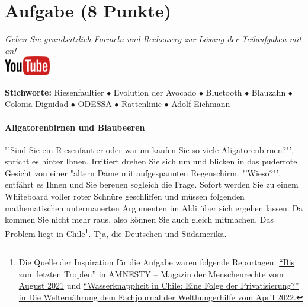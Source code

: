 \documentclass[a4paper, 9pt]{scrartcl}\usepackage[]{graphicx}\usepackage[]{xcolor}
\begin{document}
 
\clearpage

\section{Aufgabe \hfill (8 Punkte)}

\textit{Geben Sie grunds{\"a}tzlich Formeln und Rechenweg zur L{\"o}sung der
  Teilaufgaben mit an!} \\[1Ex]

\hfill\href{https://youtu.be/https://youtu.be/k2G52hMIfqk}{\includegraphics[width = 2cm]{img/youtube}} %
\hspace{2Ex}

{\tiny\textbf{Stichworte:} Riesenfaultier $\bullet$ Evolution der Avocado $\bullet$ Bluetooth $ \bullet$ Blauzahn $\bullet$ Colonia Dignidad $\bullet$ ODESSA $\bullet$ Rattenlinie $\bullet$ Adolf Eichmann}


\paragraph{Aligatorenbirnen und Blaubeeren}



"'Sind Sie ein Riesenfautier oder warum kaufen Sie so viele
Aligatorenbirnen?"', spricht es hinter Ihnen. Irritiert drehen Sie sich um
und blicken in das puderrote Gesicht von einer {"a}ltern Dame mit aufgespannten Regenschirm. "'Wieso?"', entfährt es
Ihnen und Sie bereuen sogleich die Frage. Sofort werden Sie zu einem
Whiteboard voller roter Schnüre geschliffen und müssen folgenden
mathematischen untermauerten Argumenten im Aldi über sich ergehen
lassen. Da kommen Sie nicht mehr raus, also können Sie auch gleich
mitmachen. Das Problem liegt in Chile\footnote{Die Quelle der Inspiration
  für die Aufgabe waren folgende Reportagen:
  \href{https://www.amnesty.ch/de/ueber-amnesty/publikationen/magazin-amnesty/2021-3/bis-zum-letzten-tropfen}{"`Bis
  zum letzten Tropfen"' in AMNESTY – Magazin der Menschenrechte vom August
  2021} und
\href{https://www.welthungerhilfe.de/welternaehrung/rubriken/klima-ressourcen/wassernot-in-chile-eine-folge-der-privatisierung}{"`Wasserknappheit
  in Chile: Eine Folge der Privatisierung?"' in Die Welternährung dem
  Fachjournal der Welthungerhilfe vom April 2022.}}. Tja, die Deutschen und Südamerika.\\
\end{document}

